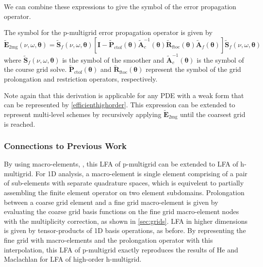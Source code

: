 \documentclass[review]{siamart190516}
\begin{document}
We can combine these expressions to give the symbol of the error propagation operator.

\begin{definition}
The symbol for the p-multigrid error propagation operator is given by
\begin{equation}
\tilde{\mathbf{E}}_{\text{2mg}} \left( \nu, \omega, \boldsymbol{\theta} \right) = \tilde{\mathbf{S}}_f \left( \nu, \omega, \boldsymbol{\theta} \right) \left[ \mathbf{I} - \tilde{\mathbf{P}}_{\text{ctof}} \left( \boldsymbol{\theta} \right) \tilde{\mathbf{A}}_c^{-1} \left( \boldsymbol{\theta} \right) \tilde{\mathbf{R}}_{\text{ftoc}} \left( \boldsymbol{\theta} \right) \tilde{\mathbf{A}}_f \left( \boldsymbol{\theta} \right) \right] \tilde{\mathbf{S}}_f \left( \nu, \omega, \boldsymbol{\theta} \right)
\end{equation}
where $\tilde{\mathbf{S}}_f \left( \nu, \omega, \boldsymbol{\theta} \right)$ is the symbol of the smoother and $\tilde{\mathbf{A}}_c^{-1} \left( \boldsymbol{\theta} \right)$ is the symbol of the course grid solve.
$\tilde{\mathbf{P}}_{\text{ctof}} \left( \boldsymbol{\theta} \right)$ and $\tilde{\mathbf{R}}_{\text{ftoc}} \left( \boldsymbol{\theta} \right)$ represent the symbol of the grid prolongation and restriction operators, respectively. 
\end{definition}\label{def:pmultigrid_symbol}

Note again that this derivation is applicable for any PDE with a weak form that can be represented by \cref{efficienthighorder}.
This expression can be extended to represent multi-level schemes by recursively applying $\tilde{\mathbf{E}}_{\text{2mg}}$ until the coarsest grid is reached.

\subsubsection{Connections to Previous Work}\label{sec:previouswork}

By using macro-elements, \cite{kumar2019local} \cite{brown2019local}, this LFA of p-multigrid can be extended to LFA of h-multigrid.
For 1D analysis, a macro-element is single element comprising of a pair of sub-elements with separate quadrature spaces, which is equivelent to partially assembling the finite element operator on two element subdomains.
Prolongation between a coarse grid element and a fine grid macro-element is given by evaluating the coarse grid basis functions on the fine grid macro-element nodes with the multiplicity correction, as shown in \cref{sec:grids}.
LFA in higher dimensions is given by tensor-products of 1D basis operations, as before.
By representing the fine grid with macro-elements and the prolongation operator with this interpolation, this LFA of p-multigrid exactly reproduces the results of He and Maclachlan \cite{he2020two} for LFA of high-order h-multigrid.
\end{document}
